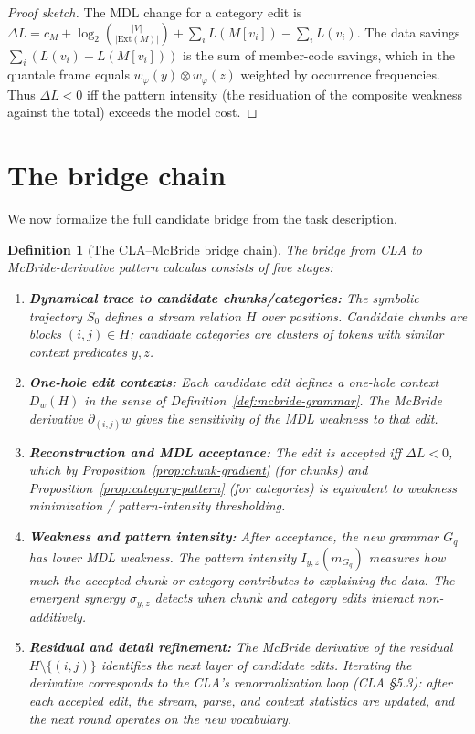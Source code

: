 \documentclass[11pt]{article}
\newtheorem{definition}{Definition}
\begin{document}
\begin{proof}[Proof sketch]
The MDL change for a category edit is $\Delta L = c_M + \log_2 \binom{|V|}{|\text{Ext}(M)|} + \sum_i L(M[v_i]) - \sum_i L(v_i)$.  The data savings $\sum_i (L(v_i) - L(M[v_i]))$ is the sum of member-code savings, which in the quantale frame equals $w_\varphi(y) \otimes w_\varphi(z)$ weighted by occurrence frequencies.  Thus $\Delta L < 0$ iff the pattern intensity (the residuation of the composite weakness against the total) exceeds the model cost.
\end{proof}

\section{The bridge chain}

We now formalize the full candidate bridge from the task description.

\begin{definition}[The CLA--McBride bridge chain]
\label{def:bridge-chain}
The bridge from CLA to McBride-derivative pattern calculus consists of five stages:

\begin{enumerate}
  \item \textbf{Dynamical trace to candidate chunks/categories:} The symbolic trajectory $S_0$ defines a stream relation $H$ over positions.  Candidate chunks are blocks $(i,j) \in H$; candidate categories are clusters of tokens with similar context predicates $y, z$.

  \item \textbf{One-hole edit contexts:} Each candidate edit defines a one-hole context $D_w(H)$ in the sense of Definition~\ref{def:mcbride-grammar}.  The McBride derivative $\partial_{(i,j)} w$ gives the sensitivity of the MDL weakness to that edit.

  \item \textbf{Reconstruction and MDL acceptance:} The edit is accepted iff $\Delta L < 0$, which by Proposition~\ref{prop:chunk-gradient} (for chunks) and Proposition~\ref{prop:category-pattern} (for categories) is equivalent to weakness minimization / pattern-intensity thresholding.

  \item \textbf{Weakness and pattern intensity:} After acceptance, the new grammar $G_q$ has lower MDL weakness.  The pattern intensity $I_{y,z}(m_{G_q})$ measures how much the accepted chunk or category contributes to explaining the data.  The emergent synergy $\sigma_{y,z}$ detects when chunk and category edits interact non-additively.

  \item \textbf{Residual and detail refinement:} The McBride derivative of the residual $H \setminus \{(i,j)\}$ identifies the next layer of candidate edits.  Iterating the derivative corresponds to the CLA's renormalization loop (CLA \S 5.3): after each accepted edit, the stream, parse, and context statistics are updated, and the next round operates on the new vocabulary.
\end{enumerate}
\end{definition}
\end{document}
